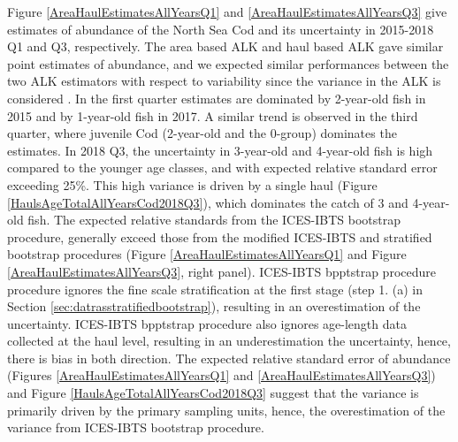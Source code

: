 \documentclass[a4paper 12pt]{article}
\numberwithin{equation}{section}
\begin{document}
 
 Figure \ref{AreaHaulEstimatesAllYearsQ1} and \ref{AreaHaulEstimatesAllYearsQ3} give estimates of abundance of the North Sea Cod and its uncertainty in 2015-2018 Q1 and Q3, respectively.  The area based ALK and haul based ALK gave similar point estimates of abundance, and we expected similar performances between the two ALK estimators with respect to variability since the variance in the ALK is considered \citep{aanes2015efficient}. In the first quarter estimates are dominated by  2-year-old fish in 2015 and by 1-year-old fish in 2017. A similar trend is observed in the third quarter, where juvenile Cod (2-year-old and the 0-group) dominates the estimates. In 2018 Q3, the uncertainty in 3-year-old and 4-year-old fish is high compared to the younger age classes, and with expected relative standard error exceeding 25\%. This high variance is driven by a single haul (Figure \ref{HaulsAgeTotalAllYearsCod2018Q3}), which dominates the catch of 3 and 4-year-old fish. The expected relative standards from the ICES-IBTS bootstrap procedure, generally exceed those from the modified ICES-IBTS and stratified bootstrap procedures (Figure \ref{AreaHaulEstimatesAllYearsQ1} and Figure \ref{AreaHaulEstimatesAllYearsQ3}, right panel). ICES-IBTS bpptstrap procedure procedure ignores the fine scale stratification at the first stage (step 1. (a)  in Section \ref{sec:datrasstratifiedbootstrap}), resulting in an overestimation of the uncertainty. ICES-IBTS bpptstrap procedure also ignores age-length data collected at the haul level, resulting in an underestimation the uncertainty, hence, there is bias in both direction. The expected relative standard error of abundance (Figures \ref{AreaHaulEstimatesAllYearsQ1} and  \ref{AreaHaulEstimatesAllYearsQ3}) and  Figure \ref{HaulsAgeTotalAllYearsCod2018Q3}  suggest that the variance is primarily driven by the primary sampling units, hence, the overestimation of the variance from ICES-IBTS bootstrap procedure.
\end{document}
